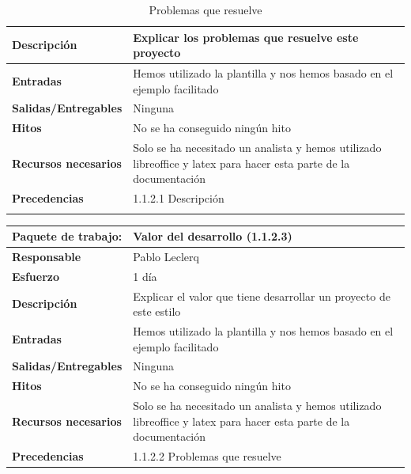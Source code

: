 \documentclass{report}
\begin{document}
\begin{center}
\begin{longtable}{|p{6cm}|p{6cm}|}
                    \textbf{Descripción} & Explicar los problemas que resuelve este proyecto\\
                    \hline
                    \textbf{Entradas} & Hemos utilizado la plantilla y nos hemos basado en el ejemplo facilitado\\
                    \hline
                    \textbf{Salidas/Entregables} & Ninguna\\
                    \hline
                    \textbf{Hitos} & No se ha conseguido ningún hito\\
                    \hline
                    \textbf{Recursos necesarios} & Solo se ha necesitado un analista y hemos utilizado libreoffice y latex para hacer esta parte de la documentación\\
                    \hline
                    \textbf{Precedencias} & 1.1.2.1 Descripción\\
                    \hline
                    \caption{Problemas que resuelve}
                \end{longtable}
                \begin{longtable}{|p{6cm}|p{6cm}|}
                    \hline
                    \textbf{Paquete de trabajo:} & Valor del desarrollo (1.1.2.3)\\
                    \hline
                    \textbf{Responsable} & Pablo Leclerq\\
                    \hline
                    \textbf{Esfuerzo} & 1 día\\
                    \hline
                    \textbf{Descripción} & Explicar el valor que tiene desarrollar un proyecto de este estilo\\
                    \hline
                    \textbf{Entradas} & Hemos utilizado la plantilla y nos hemos basado en el ejemplo facilitado\\
                    \hline
                    \textbf{Salidas/Entregables} & Ninguna\\
                    \hline
                    \textbf{Hitos} & No se ha conseguido ningún hito\\
                    \hline
                    \textbf{Recursos necesarios} & Solo se ha necesitado un analista y hemos utilizado libreoffice y latex para hacer esta parte de la documentación\\
                    \hline
                    \textbf{Precedencias} & 1.1.2.2 Problemas que resuelve\\
                    \hline

\end{longtable}
\end{center}
\end{document}
